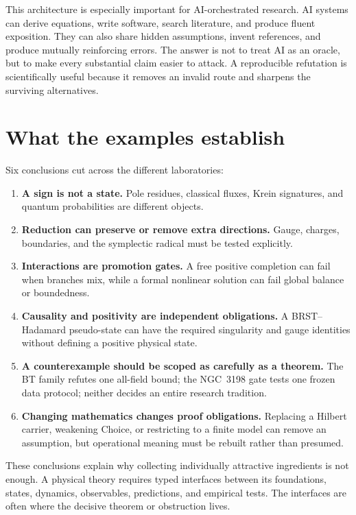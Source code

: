 \documentclass[11pt]{article}
\begin{document}
This architecture is especially important for AI-orchestrated research.  AI
systems can derive equations, write software, search literature, and produce
fluent exposition.  They can also share hidden assumptions, invent
references, and produce mutually reinforcing errors.  The answer is not to
treat AI as an oracle, but to make every substantial claim easier to attack.
A reproducible refutation is scientifically useful because it removes an
invalid route and sharpens the surviving alternatives.

\section{What the examples establish}

Six conclusions cut across the different laboratories:
\begin{enumerate}
\item \textbf{A sign is not a state.}  Pole residues, classical fluxes,
Krein signatures, and quantum probabilities are different objects.
\item \textbf{Reduction can preserve or remove extra directions.}  Gauge,
charges, boundaries, and the symplectic radical must be tested explicitly.
\item \textbf{Interactions are promotion gates.}  A free positive completion
can fail when branches mix, while a formal nonlinear solution can fail global
balance or boundedness.
\item \textbf{Causality and positivity are independent obligations.}  A
BRST--Hadamard pseudo-state can have the required singularity and gauge
identities without defining a positive physical state.
\item \textbf{A counterexample should be scoped as carefully as a theorem.}
The BT family refutes one all-field bound; the NGC~3198 gate tests one frozen
data protocol; neither decides an entire research tradition.
\item \textbf{Changing mathematics changes proof obligations.}  Replacing a
Hilbert carrier, weakening Choice, or restricting to a finite model can remove
an assumption, but operational meaning must be rebuilt rather than presumed.
\end{enumerate}

These conclusions explain why collecting individually attractive ingredients
is not enough.  A physical theory requires typed interfaces between its
foundations, states, dynamics, observables, predictions, and empirical tests.
The interfaces are often where the decisive theorem or obstruction lives.
\end{document}
